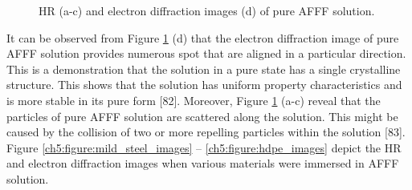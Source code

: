 \documentclass[12pt]{report}
\begin{document}
\begin{figure}[H]
\caption{HR (a-c) and electron diffraction images (d) of pure AFFF solution.}
\label{ch5:figure:pure_afff_images}
\end{figure}

It can be observed from Figure \ref{ch5:figure:pure_afff_images} (d) that the electron diffraction image of pure AFFF solution provides numerous spot that are aligned in a particular direction. This is a demonstration that the solution in a pure state has a single crystalline structure. This shows that the solution has uniform property characteristics and is more stable in its pure form [82].  Moreover, Figure \ref{ch5:figure:pure_afff_images} (a-c) reveal that the particles of pure AFFF solution are scattered along the solution. This might be caused by the collision of two or more repelling particles within the solution [83]. Figure \ref{ch5:figure:mild_steel_images} – \ref{ch5:figure:hdpe_images} depict the HR and electron diffraction images when various materials were immersed in AFFF solution. 
  
\end{document}

